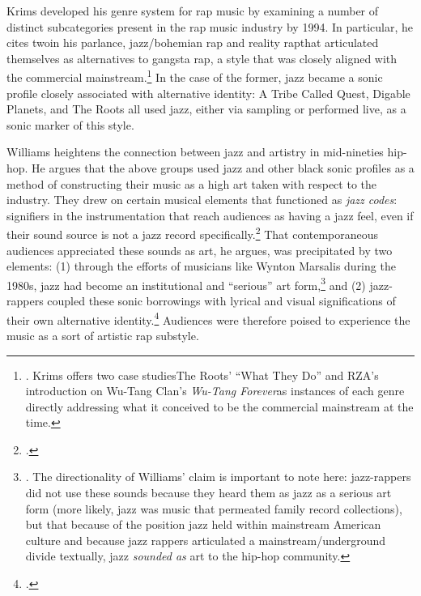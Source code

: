 Krims developed his genre system for rap music by examining a number of distinct subcategories present
in the rap music industry by 1994. In particular, he cites two\textemdash in his parlance, jazz/bohemian
rap and reality rap\textemdash that articulated themselves as alternatives to gangsta rap, a style that 
was closely aligned with the commercial mainstream.\footnote{
    \autocite[64--65]{adamkrimsRapMusicPoetics2000}. Krims offers two case studies\textemdash The Roots' 
    ``What They Do'' and RZA's introduction on Wu-Tang Clan's \textit{Wu-Tang Forever}\textemdash as 
    instances of each genre directly addressing what it conceived to be the commercial mainstream at
    the time.}
In the case of the former, jazz became a sonic profile closely associated with alternative identity:
A Tribe Called Quest, Digable Planets, and The Roots all used jazz, either via sampling or performed
live, as a sonic marker of this style.

Williams heightens the connection between jazz and artistry in mid-nineties hip-hop. He argues that 
the above groups used jazz and other black sonic profiles as a method of constructing their music as
a high art taken with respect to the industry. They drew on certain musical elements that functioned
as \emph{jazz codes}: signifiers in the instrumentation that reach audiences as having a jazz feel,
even if their sound source is not a jazz record specifically.\footnote{
    \autocite[55]{justinawilliamsRhyminStealinMusical2013}.}
That contemporaneous audiences appreciated these sounds as art, he argues, was precipitated by two 
elements: (1) through the efforts of musicians like Wynton Marsalis during the 1980s, jazz had become
an institutional and  ``serious'' art form,\footnote{
    \autocite[48--52]{justinawilliamsRhyminStealinMusical2013}. The directionality of Williams' claim 
    is important to note here: jazz-rappers did not use these sounds because they heard them as jazz 
    as a serious art form (more likely, jazz was music that permeated family record collections), but
    that because of the position jazz held within mainstream American culture and because jazz rappers
    articulated a mainstream/underground divide textually, jazz \emph{sounded as} art to the hip-hop 
    community.} 
and (2) jazz-rappers coupled these sonic borrowings with lyrical and visual significations of their 
own alternative identity.\footnote{
    \autocite[55--64]{justinawilliamsRhyminStealinMusical2013}.}
Audiences were therefore poised to experience the music as a sort of artistic rap substyle.

